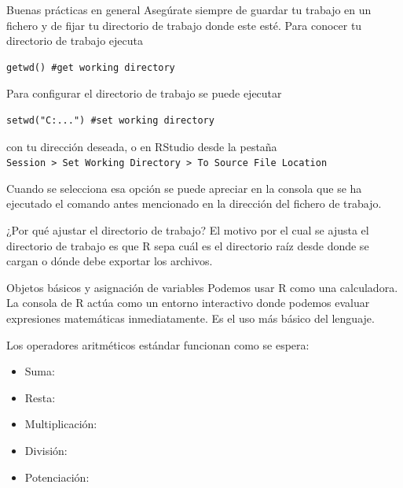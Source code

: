 \documentclass[8pt]{beamer}
\begin{document}
\begin{frame}[fragile]{Buenas prácticas en general}
	Asegúrate siempre de guardar tu trabajo en un fichero y de fijar tu directorio de trabajo donde este esté. Para conocer tu directorio de trabajo ejecuta
\begin{lstlisting}[style=RScript]
getwd() #get working directory
\end{lstlisting}

Para configurar el directorio de trabajo se puede ejecutar
\begin{lstlisting}[style=RScript]
setwd("C:...") #set working directory
\end{lstlisting}
con tu direcci\'on deseada, o en RStudio desde la pestaña\\
\verb|Session > Set Working Directory > To Source File Location|

Cuando se selecciona esa opción se puede apreciar en la consola que se ha ejecutado el comando antes mencionado en la dirección del fichero de trabajo.
\end{frame}








\begin{frame}[fragile]{¿Por qué ajustar el directorio de trabajo?}
	El motivo por el cual se ajusta el directorio de trabajo es que R sepa cuál es el directorio raíz desde donde se cargan o dónde debe exportar los archivos.
\end{frame}








\begin{frame}[fragile]{Objetos básicos y asignación de variables}
	Podemos usar R como una calculadora. La consola de R actúa como un entorno interactivo donde podemos evaluar expresiones matemáticas inmediatamente. Es el uso más básico del lenguaje.
	
	Los operadores aritméticos estándar funcionan como se espera:
	\begin{itemize}
	 \item Suma: \rscript{+}
	 \item Resta: \rscript{-}
	 \item Multiplicación: \rscript{*}
	 \item División: \rscript{/}
	 \item Potenciación: \rscript{^}
	 \end{itemize}
\end{frame}
\end{document}
